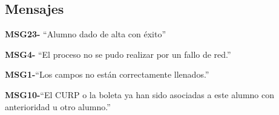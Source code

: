 \subsection{Mensajes}

\begin{Citemize}
    \item {\bf MSG23-} ``Alumno dado de alta con éxito''
    \item {\bf MSG4-}  ``El proceso no se pudo realizar por un fallo de red.''
    \item {\bf MSG1-}``Los campos no están correctamente llenados.''
    \item {\bf MSG10-}``El CURP o la boleta ya han sido asociadas a este alumno con anterioridad u otro alumno.''
\end{Citemize}
